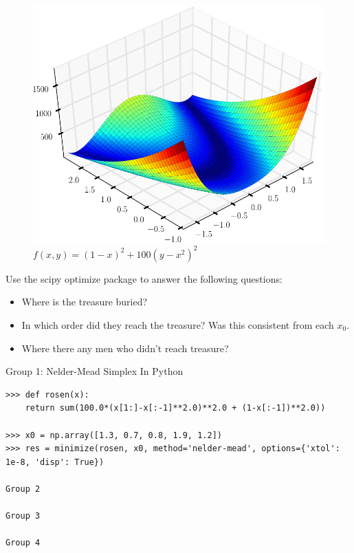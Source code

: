 \begin{figure}
\includegraphics[width=\textwidth]{Rosenbrock.pdf}
\caption{$f(x,y) = (1-x)^2 + 100(y-x^2)^2$}
\label{opt:rosenbrock}
\end{figure}

Use the scipy optimize package to answer the following questions:

\begin{itemize}

\item Where is the treasure buried?

\item In which order did they reach the treasure? Was this consistent from each $x_0$.

\item Where there any men who didn't reach treasure?

\end{itemize}

Group 1: Nelder-Mead Simplex
In Python

\begin{lstlisting}[style=python]
>>> def rosen(x):
	return sum(100.0*(x[1:]-x[:-1]**2.0)**2.0 + (1-x[:-1])**2.0))

>>> x0 = np.array([1.3, 0.7, 0.8, 1.9, 1.2])
>>> res = minimize(rosen, x0, method='nelder-mead', options={'xtol': 1e-8, 'disp': True})

Group 2

Group 3

Group 4
\end{lstlisting}
